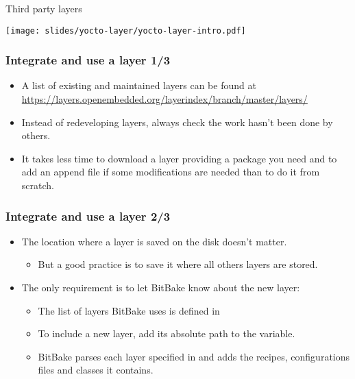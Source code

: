 \begin{frame}{Third party layers}
  \begin{center}
    \texttt{[image: slides/yocto-layer/yocto-layer-intro.pdf]}
  \end{center}
\end{frame}

\begin{frame}
  \frametitle{Integrate and use a layer 1/3}
  \begin{itemize}
    \item A list of existing and maintained layers can be found at
      \url{https://layers.openembedded.org/layerindex/branch/master/layers/}
    \item Instead of redeveloping layers, always check the work hasn't
      been done by others.
    \item It takes less time to download a layer providing a package
      you need and to add an append file if some modifications are
      needed than to do it from scratch.
  \end{itemize}
\end{frame}

\begin{frame}
  \frametitle{Integrate and use a layer 2/3}
  \begin{itemize}
    \item The location where a layer is saved on the disk doesn't
      matter.
    \begin{itemize}
      \item But a good practice is to save it where all others layers
        are stored.
    \end{itemize}
    \item The only requirement is to let BitBake know about the new
          layer:
    \begin{itemize}
      \item The list of layers BitBake uses is defined in
      \item To include a new layer, add its absolute path to the
         variable.
      \item BitBake parses each layer specified in  and
        adds the recipes, configurations files and classes it
        contains.
    \end{itemize}
  \end{itemize}
\end{frame}

